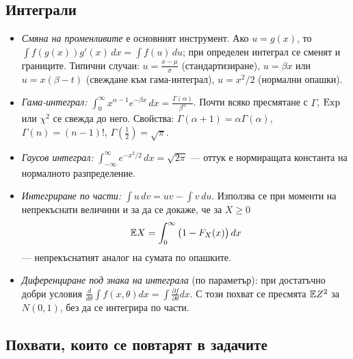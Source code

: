 \subsection*{Интеграли}

\begin{itemize}\itemsep3pt
  \item \emph{Смяна на променливите} е основният инструмент. Ако $u = g(x)$, то
        $\int f(g(x))g'(x)\,dx = \int f(u)\,du$; при определен интеграл се сменят и
        границите. Типични случаи: $u = \frac{x-\mu}{\sigma}$ (стандартизиране),
        $u = \beta x$ или $u = x(\beta-t)$ (свеждане към гама-интеграл),
        $u = x^2/2$ (нормални опашки).
  \item \emph{Гама-интеграл:}
        $\displaystyle \int_0^{\infty} x^{\alpha-1} e^{-\beta x}\,dx = \frac{\Gamma(\alpha)}{\beta^{\alpha}}$.
        Почти всяко пресмятане с $\Gamma$, $\operatorname{Exp}$ или $\chi^2$ се свежда до него.
        Свойства: $\Gamma(\alpha+1) = \alpha\Gamma(\alpha)$, $\Gamma(n) = (n-1)!$,
        $\Gamma(\tfrac12) = \sqrt{\pi}$.
  \item \emph{Гаусов интеграл:}
        $\displaystyle \int_{-\infty}^{\infty} e^{-x^2/2}\,dx = \sqrt{2\pi}$ — оттук е
        нормиращата константа на нормалното разпределение.
  \item \emph{Интегриране по части:} $\int u\,dv = uv - \int v\,du$. Използва се при
        моменти на непрекъснати величини и за да се докаже, че за $X \ge 0$
        \[ \mathbb{E} X = \int_0^{\infty} \big(1 - F_X(x)\big)\,dx \]
        — непрекъснатият аналог на сумата по опашките.
  \item \emph{Диференциране под знака на интеграла} (по параметър): при достатъчно добри
        условия $\frac{d}{d\theta}\int f(x,\theta)dx = \int \frac{\partial f}{\partial \theta}dx$.
        С този похват се пресмята $\mathbb{E} Z^2$ за $N(0,1)$, без да се интегрира по части.
\end{itemize}

\subsection*{Похвати, които се повтарят в задачите}

